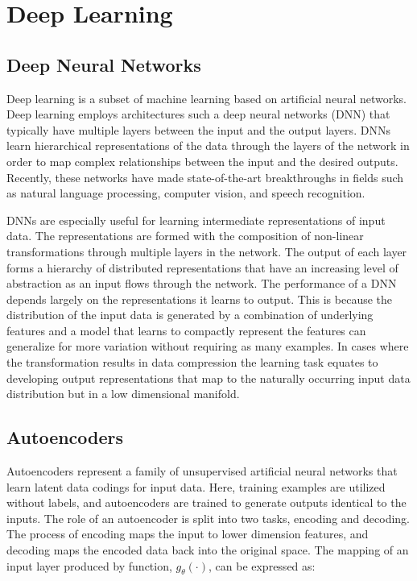 \section{Deep Learning} \label{sec:deeplearning}

\subsection{Deep Neural Networks}


Deep learning is a subset of machine learning based on artificial neural networks. Deep learning employs architectures such a deep neural networks (DNN) that typically have multiple layers between the input and the output layers. DNNs learn hierarchical representations of the data through the layers of the network in order to map complex relationships between the input and the desired outputs. Recently, these networks have made state-of-the-art breakthroughs in fields such as natural language processing, computer vision, and speech recognition.

DNNs are especially useful for learning intermediate representations of input data. The representations are formed with the composition of non-linear transformations through multiple layers in the network. The output of each layer forms a hierarchy of distributed representations that have an increasing level of abstraction as an input flows through the network. The performance of a DNN depends largely on the representations it learns to output. This is because the distribution of the input data is generated by a combination of underlying features and a model that learns to compactly represent the features can generalize for more variation without requiring as many examples. In cases where the transformation results in data compression the learning task equates to developing output representations that map to the naturally occurring input data distribution but in a low dimensional manifold.

\subsection{Autoencoders}

Autoencoders represent a family of unsupervised artificial neural networks that learn latent data codings for input data. Here, training examples are utilized without labels, and autoencoders are trained to generate outputs identical to the inputs. The role of an autoencoder is split into two tasks, encoding and decoding. The process of encoding maps the input to lower dimension features, and decoding maps the encoded data back into the original space. The mapping of an input layer produced by function, $g_{\theta}(\cdot)$, can be expressed as:
 
